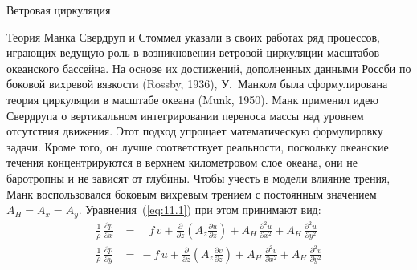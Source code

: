 \begin{chapter}{Ветровая циркуляция}
\begin{section}{Теория Манка}\label{sec:MunksSolution}
Свердруп и Стоммел указали в своих работах ряд процессов,
играющих ведущую роль в возникновении ветровой циркуляции масштабов океанского
бассейна. На основе их достижений, дополненных данными Россби по 
боковой вихревой вязкости (Rossby, 1936), У.~Манком была сформулирована теория
циркуляции в масштабе океана (Munk, 1950).
Манк применил идею Свердрупа о вертикальном интегрировании переноса
массы над уровнем отсутствия движения. Этот подход упрощает математическую 
формулировку задачи. Кроме того, он лучше соответствует реальности, поскольку
океанские течения концентрируются в верхнем километровом слое океана, они
не баротропны и не зависят от глубины. Чтобы учесть в модели влияние трения,
Манк воспользовался боковым вихревым трением с постоянным 
значением~$A_H = A_x = A_y$. Уравнения~(\ref{eq:11.1}) при этом принимают вид:
\begin{subequations}
\begin{align}
\frac{1}{\rho}\, \frac{\partial{p}}{\partial{x}}
   &=\quad f \,v+\frac{\partial}{\partial{z}}\left(A_z\frac{\partial{u}}{\partial{z}}\right) 
      + A_H\,\frac{\partial^2{u}}{\partial{x}^2} 
      + A_H\,\frac{\partial^2{u}}{\partial{y}^2} \label{eq:11.17a}\\
\frac{1}{\rho}\, \frac{\partial{p}}{\partial{y}} 
   &=\:-f \,u+\frac{\partial}{\partial{z}}\left(A_z\frac{\partial{v}}{\partial{z}}\right) 
      + A_H\,\frac{\partial^2{v}}{\partial{x}^2} 
      + A_H\,\frac{\partial^2{v}}{\partial{y}^2} \label{eq:11.17b}
\end{align}
\end{subequations}
%

\end{section}
\end{chapter}
